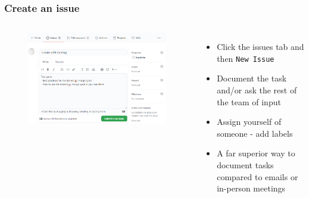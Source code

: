 \documentclass[aspectratio=169]{beamer} %
\begin{document}
\begin{frame}
	\frametitle{Create an issue}
	\begin{columns}[c]

		\vspace{-.5cm}
		\begin{figure}
			\centering
			\includegraphics[width=\textwidth]{./img/create-issue-1.png}
		\end{figure}
		
		
		\begin{itemize}
			\setlength\itemsep{.5em}
			\item Click the issues tab and then \texttt{New Issue}
			\item Document the task and/or ask the rest of the team of input
			\item Assign yourself of someone - add labels
			\item A far superior way to document tasks compared to emails or in-person meetings
		\end{itemize}
			
	\end{columns}	
\end{frame}
\end{document}
